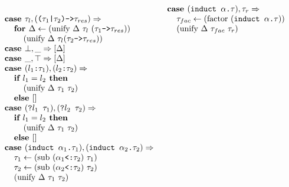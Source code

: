 \documentclass[acmsmall]{acmart}
\begin{document}
\begin{figure*}[h]
\[\begin{array}[t]{@{} l}
    \\

    \I \B{case } \tau_l, (\code{($\tau_1$|$\tau_2$)->$\tau_{res}$}) \Rightarrow 
    \\
    \I\I \B{for } \Delta \leftarrow (\F{unify } \Delta\ \tau_l\ (\code{$\tau_1$->$\tau_{res}$}))
    \\
    \I\I\I (\F{unify } \Delta\ \tau_l (\code{$\tau_2$->$\tau_{res}$})) 

    \\

    \I \B{case } \bot, \_ \Rightarrow [\Delta]

    \\

    \I \B{case } \_, \top \Rightarrow [\Delta]

    \\

    \I \B{case } (\code{$l_1$:$\tau_1$}), (\code{$l_2$:$\tau_2$}) \Rightarrow
    \\
    \I\I \B{if } l_1 = l_2 \B{ then }
    \\
    \I\I\I (\F{unify } \Delta\ \tau_1\ \tau_2)
    \\
    \I\I \B{else } []

    \\

    \I \B{case } (\code{?$l_1$ $\tau_1$}), (\code{?$l_2$ $\tau_2$}) \Rightarrow
    \\
    \I\I \B{if } l_1 = l_2 \B{ then }
    \\
    \I\I\I (\F{unify } \Delta\ \tau_1\ \tau_2)
    \\
    \I\I \B{else } []

    \\

    \I \B{case } (\code{induct $\alpha_1$.$\tau_1$}), (\code{induct $\alpha_2$.$\tau_2$}) \Rightarrow
    \\
    \I\I \tau_1 \leftarrow (\text{sub } (\code{$\alpha_1$<:$\tau_2$})\ \tau_1) 
    \\
    \I\I \tau_2 \leftarrow (\text{sub } (\code{$\alpha_2$<:$\tau_2$})\ \tau_2) 
    \\
    \I\I (\F{unify } \Delta\ \tau_1\ \tau_2)
\end{array}
\begin{array}[t]{@{} l}
    \I \B{case } (\code{induct $\alpha$.$\tau$}), \tau_r \Rightarrow
    \\
    \I\I \tau_{fac} \leftarrow (\text{factor } (\code{induct $\alpha$.$\tau$})) 
    \\
    \I\I (\F{unify } \Delta\ \tau_{fac}\ \tau_r)


\end{array}\]
\end{figure*}
\end{document}
